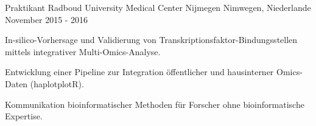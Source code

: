 \begin{cventries}
    \cventry
    {Praktikant} %
    {Radboud University Medical Center Nijmegen} %
    {Nimwegen, Niederlande} %
    {November 2015 - 2016} %
    {
      \begin{cvitems} %
        \item {In-silico-Vorhersage und Validierung von Transkriptionsfaktor-Bindungsstellen mittels integrativer Multi-Omics-Analyse.}
        \item {Entwicklung einer Pipeline zur Integration öffentlicher und hausinterner Omics-Daten (haplotplotR).}
        \item {Kommunikation bioinformatischer Methoden für Forscher ohne bioinformatische Expertise.        }
        \vspace{0.2cm}
        \newline{}    
         
      \end{cvitems}
    }

\end{cventries}
